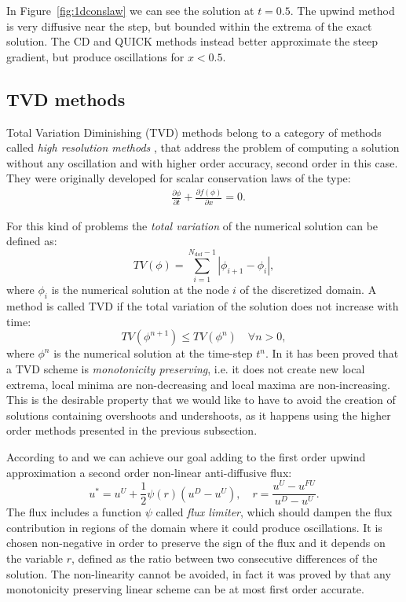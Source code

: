 In Figure~\ref{fig:1dconslaw} we can see the solution at $t=0.5$. The upwind 
method is very diffusive near the step, but bounded within the extrema of the 
exact solution. The CD and QUICK methods instead better approximate the steep 
gradient, but produce oscillations for $x<0.5$.
%
\subsection{TVD methods} \label{subsec:tvd}
Total Variation Diminishing (TVD) methods belong to a category of methods 
called \emph{high resolution methods} \cite{tvd:monotonicity}, that address the problem of computing a 
solution without any oscillation and with higher order accuracy, second 
order in this case. They were originally developed for scalar conservation laws 
of the type:
\begin{align}
	\label{eq:conslaw} &\frac{\partial \phi}{\partial t} + \frac{\partial f(\phi) 
	}{\partial x} = 0. 
\end{align}

For this kind of problems the \emph{total variation} of the numerical solution 
can be defined as:
\begin{equation}
	TV(\phi) = \sum_{i=1}^{N_\text{dof}-1} |\phi_{i+1} - \phi_i|,
\end{equation}
where $\phi_i$ is the numerical solution at the node $i$ of the discretized 
domain. A method is called TVD if the total variation of the 
solution does not increase with time: 
\begin{equation}\label{eq:tvdcondition}
	TV(\phi ^{n+1}) \leq TV(\phi^n) \quad \forall n>0,
\end{equation}
where $\phi^n$ is the numerical solution at the time-step $t^n$. In 
\cite{tvd:monotonicity} it has been proved that a TVD scheme is 
\emph{monotonicity preserving}, i.e. it does not create new 
local extrema, local minima are non-decreasing and local maxima are 
non-increasing. This is the desirable property that we would like to have to avoid the creation of solutions containing overshoots and undershoots, 
as it happens using the higher order methods presented in the previous 
subsection.

According to \cite{tvd:sweeby} and \cite{main:darwish} we can achieve our 
goal adding to the first order upwind approximation a second order 
non-linear 
anti-diffusive flux: 
\begin{equation} \label{eq:tvdformula}
u^* = u^U + \frac{1}{2}\psi(r)(u^D - u^U), \quad r = 
\frac{u^U - u^{FU}}{u^D - u^U}.
\end{equation}
The flux includes a function $\psi$ called \emph{flux limiter}, which 
should dampen the flux contribution in regions of the domain where it 
could produce oscillations. It is chosen non-negative in order to preserve the 
sign of the flux and it depends on the variable $r$, defined as the 
ratio between two consecutive differences of the solution. The non-linearity 
cannot be avoided, in fact it was proved by \textcite{tvd:godunov} that any 
monotonicity preserving linear scheme can be at most first order accurate.

